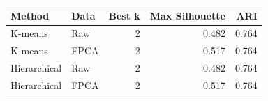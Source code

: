 
\begin{tabular}{llrrr}
\toprule
Method & Data & Best k & Max Silhouette & ARI\\
\midrule
K-means & Raw & 2 & 0.482 & 0.764\\
K-means & FPCA & 2 & 0.517 & 0.764\\
Hierarchical & Raw & 2 & 0.482 & 0.764\\
Hierarchical & FPCA & 2 & 0.517 & 0.764\\
\bottomrule
\end{tabular}
